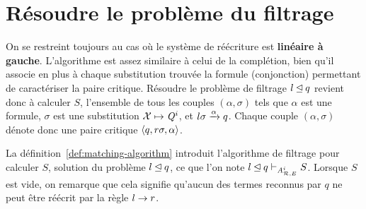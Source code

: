 

\section{Résoudre le problème du filtrage}
\label{sec:filtrage}

On se restreint toujours au cas où le système de réécriture est \textbf{linéaire à gauche}. 
L'algorithme est assez similaire à celui de la complétion, bien qu'il associe en plus à chaque substitution trouvée
la formule (conjonction) permettant de caractériser la paire critique. Résoudre le problème de filtrage $l \unlhd q$ revient donc à 
calculer $S$, l'ensemble de tous les couples $(\alpha, \sigma)$ 
tels que $\alpha$ est une formule, $\sigma$ est une substitution $\mathcal X \mapsto \mathit Q^i$, et $l\sigma \xrightarrow{\alpha} q$.
Chaque couple $(\alpha, \sigma)$ dénote donc une paire critique $\langle q,r\sigma,\alpha\rangle$.


La définition~\ref{def:matching-algorithm} introduit l'algorithme de filtrage pour calculer $S$, solution du problème $l \unlhd q$,
ce que l'on note $l \unlhd q \vdash_{{\mathit A}_{\mathcal R,E}^i} S$. Lorsque $S$ est vide, on remarque que cela signifie 
qu'aucun des termes reconnus par $q$ ne peut être réécrit par la règle $l \rightarrow r$.


